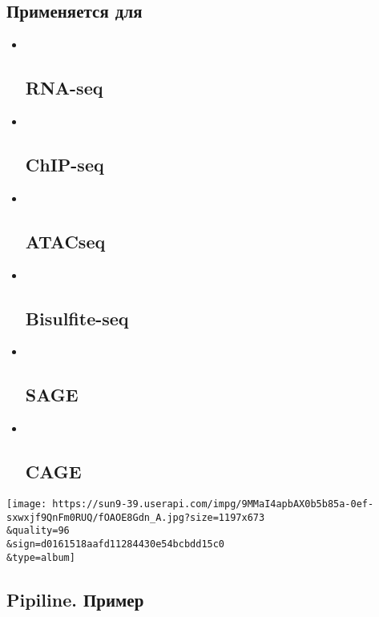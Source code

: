 \documentclass[
]{article}
\begin{document}
\begin{itemize}
{  \subsection{Применяется
  для}\label{ux43fux440ux438ux43cux435ux43dux44fux435ux442ux441ux44f-ux434ux43bux44f}}

  \begin{itemize}
  \item ~
    \hypertarget{rna-seq}{%
    \subsection{RNA-seq}\label{rna-seq}}
  \item ~
    \hypertarget{chip-seq}{%
    \subsection{ChIP-seq}\label{chip-seq}}
  \item ~
    \hypertarget{atacseq}{%
    \subsection{ATACseq}\label{atacseq}}
  \item ~
    \hypertarget{bisulfite-seq}{%
    \subsection{Bisulfite-seq}\label{bisulfite-seq}}
  \item ~
    \hypertarget{sage}{%
    \subsection{SAGE}\label{sage}}
  \item ~
    \hypertarget{cage}{%
    \subsection{CAGE}\label{cage}}
  \end{itemize}
\end{itemize}

\texttt{[image: https://sun9-39.userapi.com/impg/9MMaI4apbAX0b5b85a-0ef-sxwxjf9QnFm0RUQ/fOAOE8Gdn\_A.jpg?size=1197x673\\\&quality=96\\\&sign=d0161518aafd11284430e54bcbdd15c0\\\&type=album]}

\hypertarget{pipiline.-ux43fux440ux438ux43cux435ux440}{%
\subsection{Pipiline.
Пример}\label{pipiline.-ux43fux440ux438ux43cux435ux440}}
\end{document}
